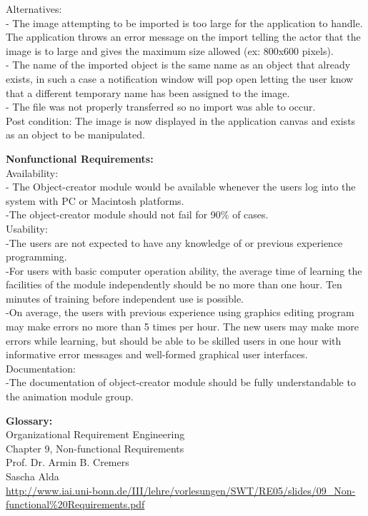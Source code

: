 \documentclass[12pt]{report}
\begin{document}
Alternatives:\\
- The image attempting to be imported is too large for the application to handle. The application throws an error message on the import telling the actor that the image is to large and gives the maximum size allowed (ex: 800x600 pixels). \\
- The name of the imported object is the same name as an object that already exists, in such a case a notification window will pop open letting the user know that a different temporary name has been assigned to the image. \\
- The file was not properly transferred so no import was able to occur.\\
Post condition:  The image is now displayed in the application canvas and exists as an object to be manipulated.

\pagebreak

{\bf\large Nonfunctional Requirements:}\\[1\baselineskip]
Availability: \\
- The Object-creator module would be available whenever the users log into the system with PC or Macintosh platforms.\\
-The object-creator module should not fail for 90\% of cases.\\[0\baselineskip]

Usability: \\
-The users are not expected to have any knowledge of or previous experience programming.\\
-For users with basic computer operation ability, the average time of learning the facilities of the module independently should be no more than one hour. Ten minutes of training before independent use is possible. \\
-On average, the users with previous experience using graphics editing program may make errors no more than 5 times per hour. The new users may make more errors while learning, but should be able to be skilled users in one hour with informative error messages and well-formed graphical user interfaces.\\[0\baselineskip]

Documentation:\\
-The documentation of object-creator module should be fully understandable to the animation module group.\\
\pagebreak

{\bf\large Glossary:}\\[1\baselineskip]
Organizational Requirement Engineering\\
Chapter 9, Non-functional Requirements\\
Prof. Dr. Armin B. Cremers\\
Sascha Alda\\
\url{http://www.iai.uni-bonn.de/III/lehre/vorlesungen/SWT/RE05/slides/09_Non-functional\%20Requirements.pdf}
\end{document}
